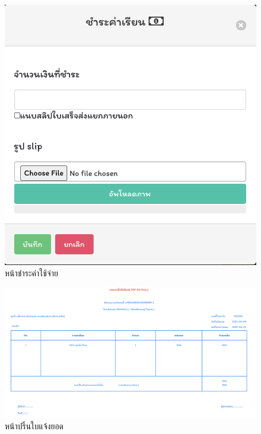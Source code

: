    
      \begin{figure}
        \begin{center}
        \includegraphics[scale=0.5]{images/UpdatePayment.png}
        \end{center}
        \caption[หน้าชำระค่าใช้จ่าย]{หน้าชำระค่าใช้จ่าย}
        \label{fig:updatePayment}
        \end{figure}
    
        \begin{figure}
          \begin{center}
          \includegraphics[width=\linewidth]{images/invoicePage.png}
          \end{center}
          \caption[หน้าปริ้นใบแจ้งยอด]{หน้าปริ้นใบแจ้งยอด}
          \label{fig:invoicePage}
          \end{figure}
    
